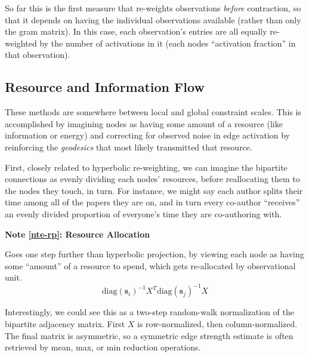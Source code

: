 \documentclass[%
	12pt,
		oneside,
		letterpaper
]{book}
\newcounter{quartocalloutnteno}
\newcommand{\quartocalloutnte}[1]{\refstepcounter{quartocalloutnteno}\label{#1}}
\begin{document}
So far this is the first measure that re-weights observations
\emph{before} contraction, so that it depends on having the individual
observations available (rather than only the gram matrix). In this case,
each observation's entries are all equally re-weighted by the number of
activations in it (each nodes ``activation fraction'' in that
observation).

\subsection{Resource and Information
Flow}\label{resource-and-information-flow}

These methods are somewhere between local and global constraint scales.
This is accomplished by imagining nodes as having some amount of a
resource (like information or energy) and correcting for observed noise
in edge activation by reinforcing the \emph{geodesics} that most likely
transmitted that resource.

First, closely related to hyperbolic re-weighting, we can imagine the
bipartite connections as evenly dividing each nodes' resources, before
reallocating them to the nodes they touch, in turn. For instance, we
might say each author splits their time among all of the papers they are
on, and in turn every co-author ``receives'' an evenly divided
proportion of everyone's time they are co-authoring with.

\begin{tcolorbox}[enhanced jigsaw, opacityback=0, colframe=quarto-callout-note-color-frame, arc=.35mm, leftrule=.75mm, breakable, bottomrule=.15mm, left=2mm, colback=white, toprule=.15mm, rightrule=.15mm]

\quartocalloutnte{nte-rp} 

\vspace{-3mm}\textbf{Note \ref*{nte-rp}: Resource Allocation}\vspace{3mm}

Goes one step further than hyperbolic projection, by viewing each node
as having some ``amount'' of a resource to spend, which gets
re-allocated by observational unit.
\autocite{Bipartitenetworkprojection_Zhou2007}
\[ \text{diag}(\mathbf{s}_i)^{-1}X^T\text{diag}(\mathbf{s}_j)^{-1}X \]

\end{tcolorbox}

Interestingly, we could see this as a two-step random-walk normalization
of the bipartite adjacency matrix. First \(X\) is row-normalized, then
column-normalized. The final matrix is asymmetric, so a symmetric edge
strength estimate is often retrieved by mean, max, or min reduction
operations.
\end{document}
